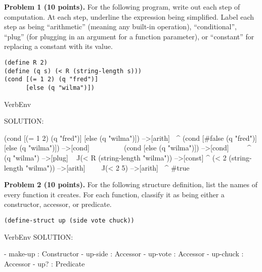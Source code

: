 \documentclass[12pt]{article}
\begin{document}
\newpage

\noindent
{\bf Problem 1 (10 points).}
%
For the following program, write out each step of computation. At each
step, underline the expression being simplified. Label each step as
being ``arithmetic'' (meaning any built-in operation),
``conditional'', ``plug'' (for plugging in an argument for a function
parameter), or ``constant'' for replacing a constant with its value.


\begin{verbatim}
(define R 2)
(define (q s) (< R (string-length s)))
(cond [(= 1 2) (q "fred")]
      [else (q "wilma")])
\end{verbatim}


\begin{SaveVerbatim}{VerbEnv}  

SOLUTION:

(cond [(= 1 2) (q "fred")] [else (q "wilma")]) -->[arith]
       ^^^^^^^
(cond [#false (q "fred")] [else (q "wilma")]) -->[cond]
^^^^^^^^^^^^^^^^^^^^^^^^^^^^^^^^^^^^^^^^^^^^^   
(cond [else (q "wilma")])                     -->[cond]
^^^^^^^^^^^^^^^^^^^^^^^^^
(q "wilma")                                   -->[plug]
^^^^^^^^^^^
(< R (string-length "wilma"))                 -->[const]
   ^
(< 2 (string-length "wilma"))                 -->[arith]
     ^^^^^^^^^^^^^^^^^^^^^^^
(< 2 5)                                       -->[arith]
^^^^^^^
#true
\end{SaveVerbatim}


\newpage

\noindent
{\bf Problem 2 (10 points).}
%
For the following structure definition, list the names of every
function it creates.  For each function, classify it as being either a
constructor, accessor, or predicate.

\begin{verbatim}
(define-struct up (side vote chuck))
\end{verbatim}

\begin{SaveVerbatim}{VerbEnv}  
SOLUTION:

- make-up    : Constructor
- up-side    : Accessor
- up-vote    : Accessor
- up-chuck   : Accessor
- up?        : Predicate
\end{SaveVerbatim}

\end{document}
